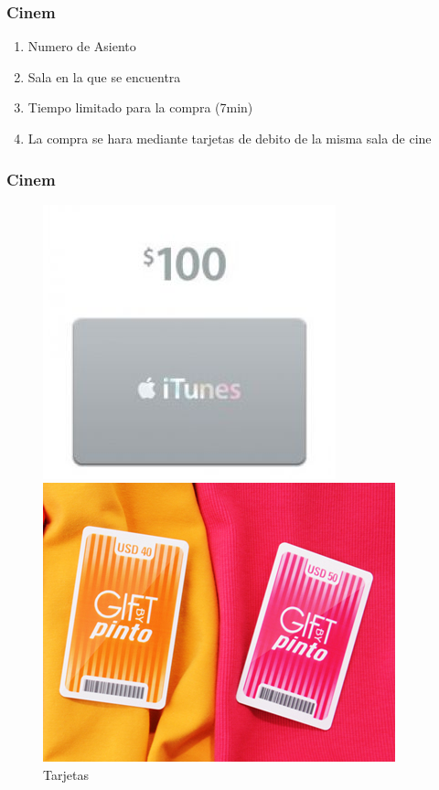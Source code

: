 \documentclass{beamer}
\begin{document}
\begin{frame}[allowframbreaks]
\frametitle{Cinem}
\begin{enumerate}
\item Numero de Asiento
\item Sala en la que se encuentra
\item Tiempo limitado para la compra (7min)
\item La compra se hara mediante tarjetas de debito de la misma sala de cine
\end{enumerate}
\end{frame}

\begin{frame}[allowframbreaks]
\frametitle{Cinem}
\begin{figure}[h]
\hfill
\begin{minipage}[t]{.45\textwidth}
\begin{center}
\includegraphics[height=0.5\textheight]{tarjetaapple.jpg} %
\end{center}
\end{minipage}
\hfill
\begin{minipage}[t]{.45\textwidth}
\begin{center}
\includegraphics[height=0.4\textheight]{tarjetapinto.jpg} %
\end{center}
\end{minipage}
\hfill
\caption{Tarjetas}
\end{figure}
\end{frame}
\end{document}
